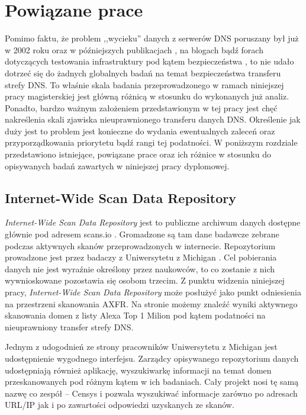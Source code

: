 \chapter{Powiązane prace}
\noindent Pomimo faktu, że problem ,,wycieku'' danych z serwerów DNS poruszany był już w 2002 roku \cite{uscert2} oraz w późniejszych
publikacjach \cite{uscert}, na blogach bądź forach dotyczących testowania infrastruktury pod kątem bezpieczeństwa
\cite{stackexchange, zonetransfer}, to nie udało dotrzeć
się do żadnych globalnych badań na temat bezpieczeństwa transferu strefy DNS. To właśnie skala badania przeprowadzonego w ramach
niniejszej pracy magisterskiej jest główną różnicą w stosunku do wykonanych już analiz. Ponadto, bardzo ważnym założeniem
przedstawionym w tej pracy jest chęć nakreślenia skali zjawiska nieuprawnionego transferu danych DNS. Określenie jak duży jest to
problem jest konieczne do wydania ewentualnych zaleceń oraz przyporządkowania priorytetu bądź rangi tej podatności. W poniższym
rozdziale przedstawiono istniejące, powiązane prace oraz ich różnice w stosunku do opisywanych badań zawartych w niniejszej pracy
dyplomowej.

\section{Internet-Wide Scan Data Repository}
\noindent \textit{Internet-Wide Scan Data Repository} jest to publiczne archiwum danych dostępne głównie pod adresem scans.io \cite{scans.io}.
Gromadzone są tam dane badawcze zebrane podczas aktywnych skanów przeprowadzonych w internecie. Repozytorium prowadzone jest przez
badaczy z Uniwersytetu z Michigan \cite{censys}. Cel pobierania danych nie jest wyraźnie określony przez naukowców, to co zostanie z
nich wywnioskowane pozostawia się osobom trzecim. Z punktu widzenia niniejszej pracy, \textit{Internet-Wide Scan Data Repository}
może posłużyć jako punkt odniesienia na przestrzeni skanowania AXFR. Na stronie możemy znaleźć wyniki aktywnego skanowania domen z
listy Alexa Top 1 Milion \cite{alexa} pod kątem podatności na nieuprawniony transfer strefy DNS.

Jednym z udogodnień ze strony pracowników Uniwersytetu z Michigan jest udostępnienie wygodnego interfejsu. Zarządcy
opisywanego repozytorium danych udostępniają również aplikację, wyszukiwarkę informacji na temat domen przeskanowanych pod różnym
kątem w ich badaniach. Cały projekt nosi tę samą nazwę co zespół -- Censys \cite{censys} i pozwala wyszukiwać informacje zarówno po
adresach URL/IP jak i po zawartości odpowiedzi uzyskanych ze skanów.


